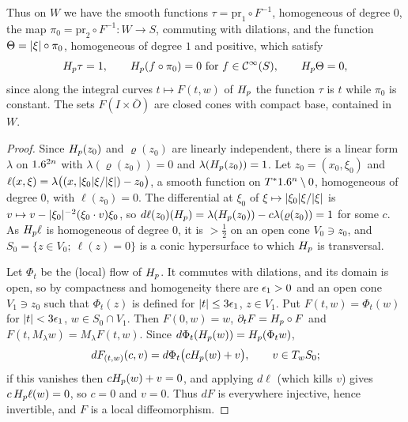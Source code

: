 Thus on $W$ we have the smooth functions $\tau=\mathrm{pr}_1\circ F^{-1}$,
homogeneous of degree $0$, the map $\pi_0=\mathrm{pr}_2\circ F^{-1}:W\to S$,
commuting with dilations, and the function $\Theta=\lvert \xi\rvert\circ\pi_0$,
homogeneous of degree $1$ and positive, which satisfy
\begin{equation}\label{microlocal:eq:flow-box}
  H_{p}\tau=1,\qquad H_{p}(f\circ\pi_0)=0\ \text{for }f\in\mathcal{C}^\infty(S),\qquad H_{p}\Theta=0,
\end{equation}
since along the integral curves $t\mapsto F(t,w)$ of $H_{p}$ the function
$\tau$ is $t$ while $\pi_0$ is constant. The sets $F(I\times\bar O)$ are
closed cones with compact base, contained in $W$.

\begin{proof}
  Since $H_{p}(z_0)$ and $\varrho(z_0)$ are linearly independent, there is a
  linear form $\lambda$ on $1.6^{2n}$ with $\lambda(\varrho(z_0))=0$ and
  $\lambda(H_{p}(z_0))=1$. Let $z_0=(x_0,\xi_0)$ and
  $\ell(x,\xi)=\lambda\bigl((x,\lvert \xi_0\rvert\xi/\lvert \xi\rvert)-z_0\bigr)$, a smooth function
  on $T^*1.6^n\setminus0$, homogeneous of degree $0$, with $\ell(z_0)=0$. The
  differential at $\xi_0$ of $\xi\mapsto\lvert \xi_0\rvert\xi/\lvert \xi\rvert$ is
  $v\mapsto v-\lvert \xi_0\rvert^{-2}(\xi_0\cdot v)\xi_0$, so
  $d\ell(z_0)(H_{p})=\lambda(H_{p}(z_0))-c\lambda(\varrho(z_0))=1$ for some $c$.
  As $H_{p}\ell$ is homogeneous of degree $0$, it is $>\frac12$ on an open cone
  $V_0\ni z_0$, and $S_0=\{z\in V_0;\ \ell(z)=0\}$ is a conic hypersurface to
  which $H_{p}$ is transversal.

  Let $\Phi_t$ be the (local) flow of $H_{p}$. It commutes with dilations,
  and its domain is open, so by compactness and homogeneity there are
  $\epsilon_1>0$ and an open cone $V_1\ni z_0$ such that $\Phi_t(z)$ is defined for
  $\lvert t\rvert\le3\epsilon_1$, $z\in V_1$. Put $F(t,w)=\Phi_t(w)$ for $\lvert t\rvert<3\epsilon_1$,
  $w\in S_0\cap V_1$. Then $F(0,w)=w$, $\partial_tF=H_{p}\circ F$ and
  $F(t,M_\lambda w)=M_\lambda F(t,w)$. Since $d\Phi_t(H_{p}(w))=H_{p}(\Phi_tw)$,
  \begin{equation*}
    dF_{(t,w)}(c,v)=d\Phi_t\bigl(cH_{p}(w)+v\bigr),\qquad v\in T_wS_0;
  \end{equation*}
  if this vanishes then $cH_{p}(w)+v=0$, and applying $d\ell$ (which kills
  $v$) gives $c\,H_{p}\ell(w)=0$, so $c=0$ and $v=0$. Thus $dF$ is everywhere
  injective, hence invertible, and $F$ is a local diffeomorphism.


\end{proof}
